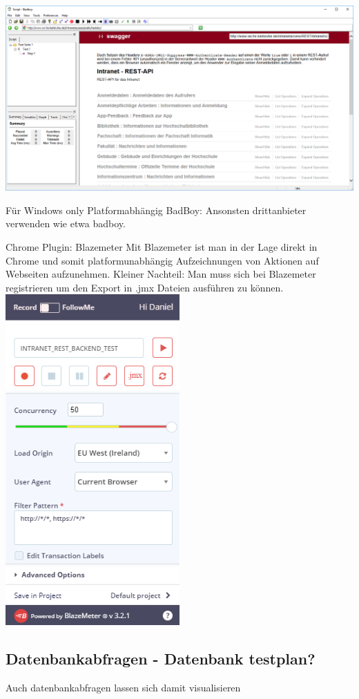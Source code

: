 \documentclass[a4paper,12pt]{article}
\begin{document}
\includegraphics[width=1\textwidth]{bilder/badboy.png}\par\vspace{1cm}
Für Windows only Platformabhängig BadBoy:
Ansonsten drittanbieter verwenden wie etwa badboy.

Chrome Plugin:
Blazemeter
Mit Blazemeter ist man in der Lage direkt in Chrome und somit platformunabhängig Aufzeichnungen von Aktionen auf Webseiten aufzunehmen.
Kleiner Nachteil: Man muss sich bei Blazemeter registrieren um den Export in .jmx Dateien ausführen zu können.
\includegraphics[width=0.5\textwidth]{bilder/blazemeter.png}\par\vspace{1cm}

\subsection{Datenbankabfragen - Datenbank testplan?}
Auch datenbankabfragen lassen sich damit visualisieren
\end{document}
